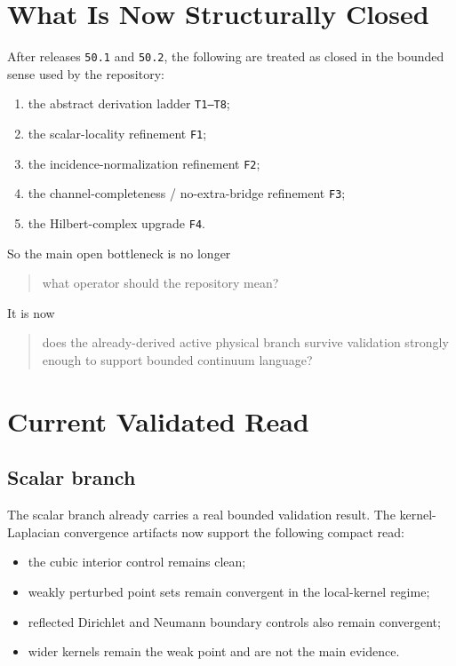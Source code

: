 \documentclass[11pt]{article}
\begin{document}
\section{What Is Now Structurally Closed}

After releases \texttt{50.1} and \texttt{50.2}, the following are treated as closed in the bounded sense used by the repository:
\begin{enumerate}
\item the abstract derivation ladder \texttt{T1--T8};
\item the scalar-locality refinement \texttt{F1};
\item the incidence-normalization refinement \texttt{F2};
\item the channel-completeness / no-extra-bridge refinement \texttt{F3};
\item the Hilbert-complex upgrade \texttt{F4}.
\end{enumerate}

So the main open bottleneck is no longer
\begin{quote}
what operator should the repository mean?
\end{quote}

It is now
\begin{quote}
does the already-derived active physical branch survive validation strongly enough to support bounded continuum language?
\end{quote}

\section{Current Validated Read}

\subsection{Scalar branch}

The scalar branch already carries a real bounded validation result. The kernel-Laplacian convergence artifacts now support the following compact read:
\begin{itemize}
\item the cubic interior control remains clean;
\item weakly perturbed point sets remain convergent in the local-kernel regime;
\item reflected Dirichlet and Neumann boundary controls also remain convergent;
\item wider kernels remain the weak point and are not the main evidence.
\end{itemize}
\end{document}
